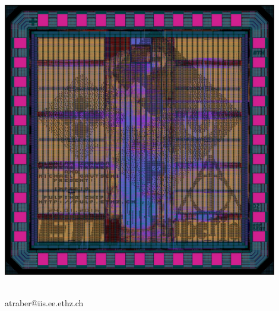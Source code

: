 \makeatletter
\begin{titlepage}

 \thispagestyle{empty}

 \begin{center}

  \begin{spacing}{2.0}
  {\Huge\textbf{\@title}}
  \end{spacing}

  \vspace{0.2cm}

  \vfill

  \includegraphics[height = 12cm]{figures/imperio_layout}

  \vfill

  {\Large \@author}\\
  {atraber@iis.ee.ethz.ch}
  \vfill
  \@date

 \end{center}
\end{titlepage}
\makeatother

